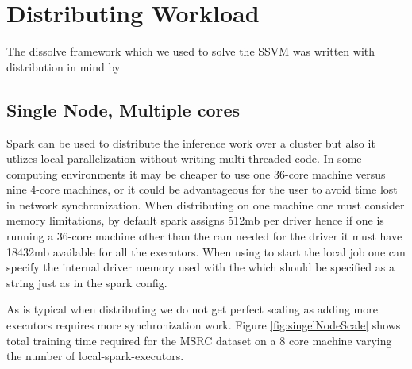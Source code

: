 %
%
%
%
%
%
%
%
%
%
%
%
%
%
%
%
%
%
%





\chapter{Distributing Workload}
The dissolve framework which we used to solve the SSVM was written with distribution in mind by 

\section{Single Node, Multiple cores}
Spark can be used to distribute the inference work over a cluster but also it utlizes local parallelization without writing multi-threaded code. In some computing environments it may be cheaper to use one 36-core machine versus nine 4-core machines, or it could be advantageous for the user to avoid time lost in network synchronization.  When distributing on one machine one must consider memory limitations, by default spark assigns 512mb per driver hence if one is running a 36-core machine other than the ram needed for the driver it must have 18432mb available for all the executors. When using  to start the local job one can specify the internal driver memory used with the  which should be specified as a string just as in the spark config. 
\par
As is typical when distributing we do not get perfect scaling as adding more executors requires more synchronization work. Figure \ref{fig:singelNodeScale} shows total training time required for the MSRC dataset on a 8 core machine varying the number of local-spark-executors. 
